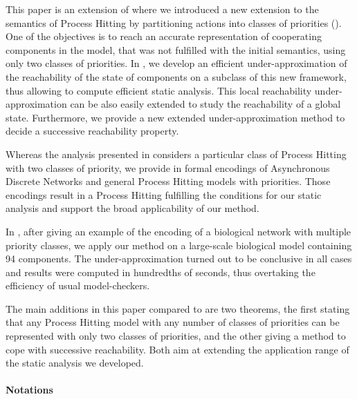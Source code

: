 This paper is an extension of \cite{FPMR13-CS2Bio} where we
introduced a new extension to the semantics of Process Hitting by partitioning actions into classes of priorities
().
One of the objectives is to reach an accurate representation of cooperating components in the model, that was not fulfilled with the initial semantics, using only two classes of priorities.
In ,
we develop an efficient under-approximation of the reachability of the state of components on a subclass of this new framework, thus allowing to compute efficient static analysis.
This local reachability under-approximation can be also easily extended to study the reachability of a global state.
Furthermore, we provide a new extended under-approximation method to decide a successive reachability property.

Whereas the analysis presented in  considers a particular class of
Process Hitting with two classes of priority,
we provide in  formal encodings of Asynchronous Discrete Networks and general
Process Hitting models with priorities.
Those encodings result in a Process Hitting fulfilling the conditions for our
static analysis and support the broad applicability of our method.

In , after giving an example of the encoding of a biological
network with multiple priority classes,
we apply our method on a large-scale biological model containing 94 components.
The under-approximation turned out to be conclusive in all cases and results were computed in hundredths of seconds,
thus overtaking the efficiency of usual model-checkers.

The main additions in this paper compared to \cite{FPMR13-CS2Bio} are
two theorems, the first
stating that any Process Hitting model with any number of classes of priorities can be represented
with only two classes of priorities,
and the other giving a method to cope with successive reachability.
Both aim at extending the application range of the static analysis we developed.



\paragraph*{Notations}

